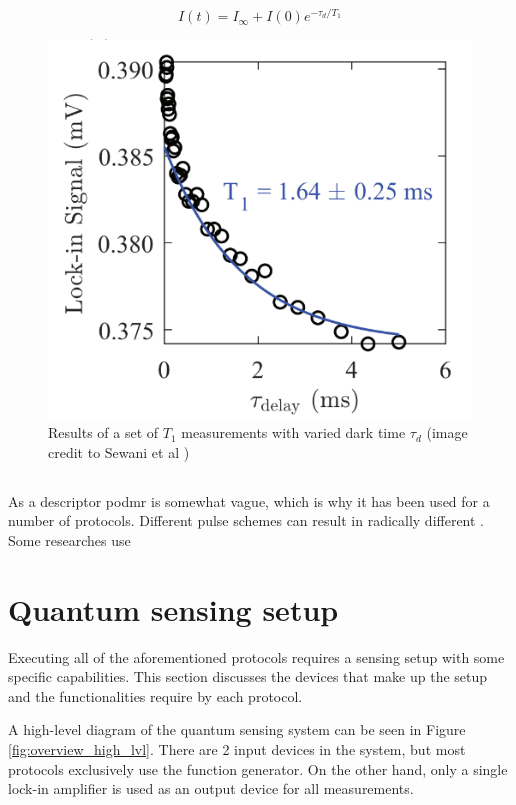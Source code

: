\begin{equation}\label{eq:t1}
I(t)=I_\infty+I(0)e^{-\tau_d/T_1}
\end{equation}



\begin{figure}[ht]
	\centering
	\includegraphics[width=0.7\linewidth]{img/t1_result}
	\caption{Results of a set of $T_1$ measurements with varied dark time $\tau_d$ (image credit to Sewani et al \cite{sewani2020coherent})}
	\label{fig:t1result}
\end{figure}



\subsection{}
As a descriptor \gls{podmr} is somewhat vague, which is why it has been used for a number of protocols. Different pulse schemes can result in radically different . Some researches use 

\section{Quantum sensing setup}\label{chap:td:quantum_setup}
Executing all of the aforementioned protocols requires a sensing setup with some specific capabilities. This section discusses the devices that make up the setup and the functionalities require by each protocol.

A high-level diagram of the quantum sensing system can be seen in Figure \ref{fig:overview_high_lvl}. There are 2 input devices in the system, but most protocols exclusively use the function generator. On the other hand, only a single lock-in amplifier is used as an output device for all measurements. 

